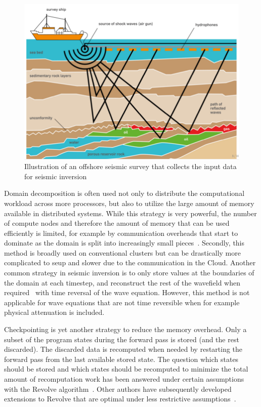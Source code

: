 \documentclass[conference]{IEEEtran}
\begin{document}
\begin{figure}
\begin{center}
\includegraphics[width=0.8\linewidth]{images/survey-ship-diagram.png}
\end{center}
\caption{Illustration of an offshore seismic survey that collects the input data for seismic inversion}
\label{fig:offshore_survey}
\end{figure}

Domain decomposition is often used not only to distribute the computational
workload across more processors, but also to utilize the large amount of memory
available in distributed systems. While this strategy is very powerful, the
number of compute nodes and therefore the amount of memory that can be used
efficiently is limited, for example by communication overheads that start to
dominate as the domain is split into increasingly small pieces~\cite{virieux2009seismic}. Secondly, this method is broadly used on conventional clusters but can be drastically more complicated to seup and slower due to the communication in the Cloud.
Another common strategy in seismic inversion is to only store values at the boundaries of the domain at each timestep, and reconstruct the rest of the wavefield when required~\cite{clapp2009reverse,yang2014rtm} with time reversal of the wave equation. However, this method is not applicable for wave equations that are not time reversible when for example physical attenuation is included.

Checkpointing is yet another strategy to reduce the memory overhead. Only a
subset of the program states during the forward pass is stored (and the rest
discarded). The discarded data is recomputed when needed by restarting the
forward pass from the last available stored state. The question which states
should be stored and which states should be recomputed to minimize the total
amount of recomputation work has been answered under certain assumptions with the Revolve algorithm~\cite{griewank2000algorithm}.  Other authors have subsequently developed extensions to Revolve that are optimal under less restrictive assumptions~\cite{wang2009minimal,aupy2016optimal,schanen2016asynchronous}.
\end{document}
